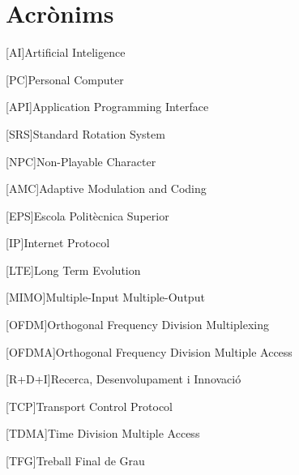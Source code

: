 \chapter{Acrònims} %
%
%
\begin{acronym}

[AI]{Artificial Inteligence}

[PC]{Personal Computer}

[API]{Application Programming Interface}

[SRS]{Standard Rotation System}

[NPC]{Non-Playable Character}


[AMC]{Adaptive Modulation and Coding}

[EPS]{Escola Politècnica Superior}

[IP]{Internet Protocol}

[LTE]{Long Term Evolution}

[MIMO]{Multiple-Input Multiple-Output}

[OFDM]{Orthogonal Frequency Division Multiplexing}

[OFDMA]{Orthogonal Frequency Division Multiple Access}

[R+D+I]{Recerca, Desenvolupament i Innovació}

[TCP]{Transport Control Protocol}

[TDMA]{Time Division Multiple Access}

[TFG]{Treball Final de Grau}


\end{acronym}
